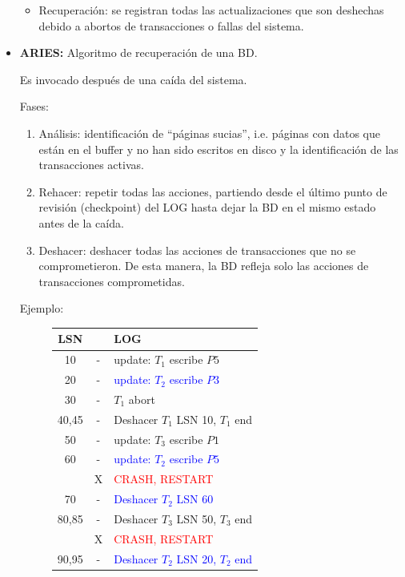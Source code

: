 \documentclass{templateNote}
\begin{document}
\begin{itemize}
\begin{itemize}
        \item Recuperación: se registran todas las actualizaciones que son deshechas debido a abortos de transacciones o fallas del sistema.
    \end{itemize}

    \item \textbf{ARIES:} Algoritmo de recuperación de una BD.
    
    Es invocado después de una caída del sistema.

    Fases:
    \begin{enumerate}
        \item Análisis: identificación de “páginas sucias”, i.e. páginas con datos que están en el buffer y no han sido escritos en disco y la identificación de las transacciones activas.

        \item Rehacer: repetir todas las acciones, partiendo desde el último punto de revisión (checkpoint) del LOG hasta dejar la BD en el mismo estado antes de la caída.

        \item Deshacer: deshacer todas las acciones de transacciones que no se comprometieron. De esta manera, la BD refleja solo las acciones de transacciones comprometidas.
    \end{enumerate}

    Ejemplo:

    \begin{figure}[H]
        \centering
        \begin{tabular}{|c|c|l|}
            \hline
            \textbf{LSN} & & \textbf{LOG} \\ \hline
            10 & - & \textcolor{green!80!black}{update: $T_1$ escribe $P5$} \\
            20 & - & \textcolor{blue}{update: $T_2$ escribe $P3$} \\
            30 & - & \textcolor{green!80!black}{$T_1$ abort} \\
            40,45 & - & \textcolor{green!80!black}{Deshacer $T_1$ LSN 10, $T_1$ end} \\
            50 & - & \textcolor{purple!50!black}{update: $T_3$ escribe $P1$} \\
            60 & - & \textcolor{blue}{update: $T_2$ escribe $P5$} \\
            & X & \textcolor{red}{CRASH, RESTART} \\
            70 & - & \textcolor{blue}{Deshacer $T_2$ LSN 60}
            \\
            80,85 & - & \textcolor{purple!50!black}{Deshacer $T_3$ LSN 50, $T_3$ end} \\
            & X & \textcolor{red}{CRASH, RESTART} \\
            90,95 & - & \textcolor{blue}{Deshacer $T_2$ LSN 20, $T_2$ end} \\ \hline
        \end{tabular}   
    \end{figure}
\end{itemize}
\end{document}
